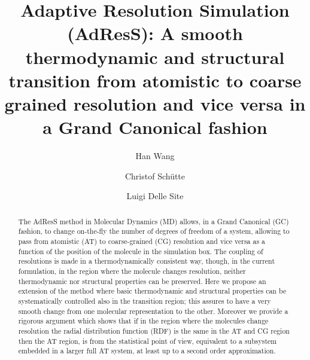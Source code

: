 \documentclass[aps,prb,preprint,citeautoscript]{revtex4}
\begin{document}
\title{Adaptive Resolution Simulation (AdResS): A smooth thermodynamic and structural transition from atomistic to coarse grained resolution and vice versa in a Grand Canonical fashion}
\author{Han Wang}
\author{Christof Sch\"utte}
\author{Luigi Delle Site}


\begin{abstract}
The AdResS method in Molecular Dynamics (MD) allows, in a Grand Canonical (GC) fashion, to change on-the-fly the number of degrees of freedom of a system, allowing to pass from atomistic (AT) to coarse-grained (CG) resolution and vice versa as a function of the position of the molecule in the simulation box. The coupling of resolutions is made in a thermodynamically consistent way, though, in the current formulation, in the region where the molecule changes resolution, neither thermodynamic nor structural properties can be preserved. Here we propose an extension of the method where basic thermodynamic and structural properties can be systematically controlled also in the transition region; this assures to have a very smooth change from one molecular representation to the other. Moreover we provide a rigorous argument which shows that if in the region where the molecules change resolution the radial distribution function (RDF) is the same in the AT and CG region then the AT region, is from the statistical point of view, equivalent to a subsystem embedded in a larger full AT system, at least up to a second order approximation.    
\end{abstract}

\maketitle
\end{document}
